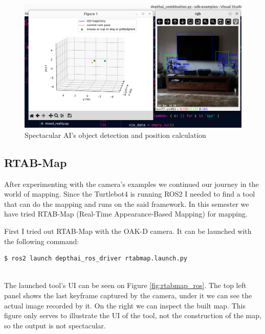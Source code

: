 \begin{figure}[H]
	\centering
	\includegraphics[width=150mm, keepaspectratio]{figures/spectacular_ai_depthai_combination.png}
	\caption{Spectacular AI's object detection and position calculation}
	\label{fig:SPAI_depthai}
\end{figure}

\subsection{RTAB-Map}

After experimenting with the camera's examples we continued our journey in the world of mapping. Since the Turtlebot4 is running ROS2 I needed to find a tool that can do the mapping and runs on the said framework. In this semester we have tried RTAB-Map (Real-Time Appearance-Based Mapping)\cite{RTAB_Map_docs} for mapping.

First I tried out RTAB-Map with the OAK-D camera. It can be launched with the following command:
\begin{lstlisting}[language=bash,frame=single,float=!ht]
$ ros2 launch depthai_ros_driver rtabmap.launch.py
\end{lstlisting}\\
The launched tool's UI can be seen on Figure \ref{fig:rtabmap_ros}. The top left panel shows the last keyframe captured by the camera, under it we can see the actual image recorded by it. On the right we can inspect the built map. This figure only serves to illustrate the UI of the tool, not the construction of the map, so the output is not spectacular.

